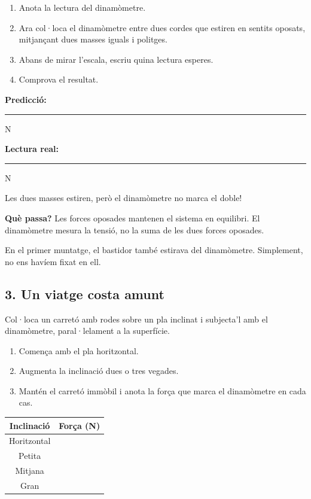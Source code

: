 \begin{enumerate}
    \item Anota la lectura del dinamòmetre.
    \item Ara col·loca el dinamòmetre entre dues cordes que estiren en sentits oposats, mitjançant dues masses iguals i politges.
    \item Abans de mirar l'escala, escriu quina lectura esperes.
    \item Comprova el resultat.
\end{enumerate}

\textbf{Predicció:} \rule{1.5cm}{0.4pt} N

\textbf{Lectura real:} \rule{1.5cm}{0.4pt} N

Les dues masses estiren, però el dinamòmetre no marca el doble!

\textbf{Què passa?} Les forces oposades mantenen el sistema en equilibri. El dinamòmetre mesura la tensió, no la suma de les dues forces oposades.

En el primer muntatge, el bastidor també estirava del dinamòmetre. Simplement, no ens havíem fixat en ell.

\subsection{3. Un viatge costa amunt}

Col·loca un carretó amb rodes sobre un pla inclinat i subjecta'l amb el dinamòmetre, paral·lelament a la superfície.

\begin{enumerate}
    \item Comença amb el pla horitzontal.
    \item Augmenta la inclinació dues o tres vegades.
    \item Mantén el carretó immòbil i anota la força que marca el dinamòmetre en cada cas.
\end{enumerate}

\begin{center}
\begin{tabular}{|c|c|}
\hline
Inclinació & Força (N) \\ \hline
Horitzontal & \\[0.7em] \hline
Petita & \\[0.7em] \hline
Mitjana & \\[0.7em] \hline
Gran & \\[0.7em] \hline
\end{tabular}
\end{center}

